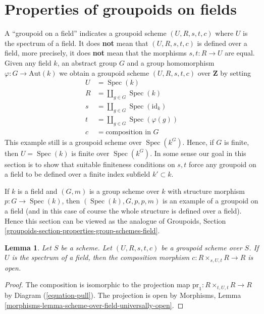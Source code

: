 \documentclass{stacks-project}
\theoremstyle{plain}
\newtheorem{lemma}[subsection]{Lemma}
\theoremstyle{definition}
\theoremstyle{remark}
\numberwithin{equation}{subsection}
\def\Spec{\mathop{\mathrm{Spec}}}
\begin{document}
\section{Properties of groupoids on fields}
\label{section-properties-groupoids-on-fields}

\noindent
A ``groupoid on a field'' indicates a groupoid scheme $(U, R, s, t, c)$
where $U$ is the spectrum of a field. It does {\bf not} mean that
$(U, R, s, t, c)$ is defined over a field, more precisely, it does
{\bf not} mean that the morphisms $s, t : R \to U$ are equal.
Given any field $k$, an abstract group $G$ and a group homomorphism
$\varphi : G \to \text{Aut}(k)$ we obtain a groupoid scheme
$(U, R, s, t, c)$ over $\mathbf{Z}$ by setting
\begin{align*}
U & = \Spec(k) \\
R & = \coprod\nolimits_{g \in G} \Spec(k) \\
s & = \coprod\nolimits_{g \in G} \Spec(\text{id}_k) \\
t & = \coprod\nolimits_{g \in G} \Spec(\varphi(g)) \\
c & = \text{composition in }G
\end{align*}
This example still is a groupoid scheme over $\Spec(k^G)$.
Hence, if $G$ is finite, then $U = \Spec(k)$ is finite over
$\Spec(k^G)$.
In some sense our goal in this section is to show that suitable
finiteness conditions on $s, t$ force any groupoid on a field
to be defined over a finite index subfield $k' \subset k$.

\medskip\noindent
If $k$ is a field and $(G, m)$ is a group scheme over $k$ with structure
morphism $p : G \to \Spec(k)$, then $(\Spec(k), G, p, p, m)$
is an example of a groupoid on a field (and in this case of course the whole
structure is defined over a field). Hence this section can be viewed as the
analogue of
Groupoids, Section \ref{groupoids-section-properties-group-schemes-field}.

\begin{lemma}
\label{lemma-groupoid-on-field-open-multiplication}
Let $S$ be a scheme. Let $(U, R, s, t, c)$ be a groupoid scheme
over $S$. If $U$ is the spectrum of a field, then the composition
morphism $c : R \times_{s, U, t} R \to R$ is open.
\end{lemma}

\begin{proof}
The composition is isomorphic to the projection map
$\text{pr}_1 : R \times_{t, U, t} R \to R$ by
Diagram (\ref{equation-pull}).
The projection is open by
Morphisms, Lemma \ref{morphisms-lemma-scheme-over-field-universally-open}.
\end{proof}
\end{document}
